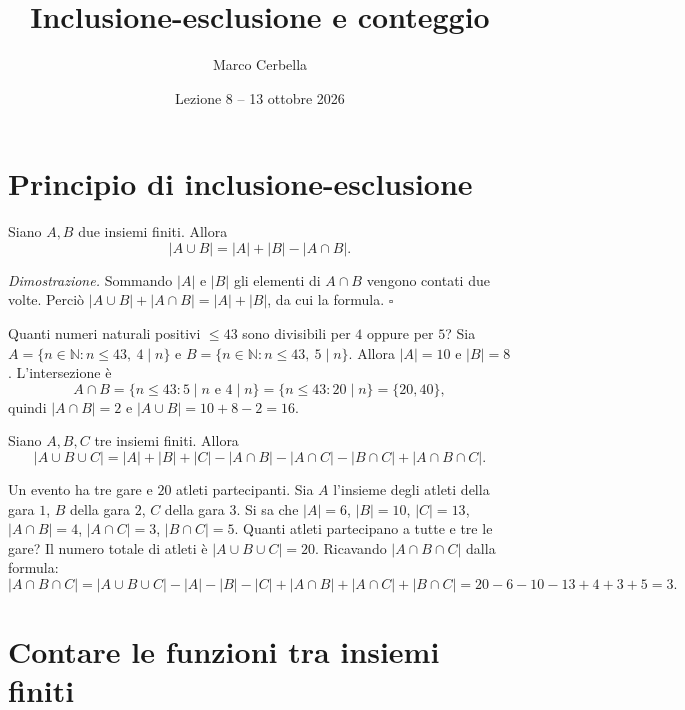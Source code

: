 \documentclass[11pt,a4paper]{article}
\title{Inclusione-esclusione e conteggio}
\author{Marco Cerbella}
\date{Lezione 8 -- 13 ottobre 2026}
\begin{document}
\maketitle

\section{Principio di inclusione-esclusione}

\begin{proposizione}
Siano $A, B$ due insiemi finiti. Allora
\[
|A \cup B| = |A| + |B| - |A \cap B|.
\]
\end{proposizione}

\emph{Dimostrazione.} Sommando $|A|$ e $|B|$ gli elementi di $A \cap B$ vengono contati due volte. Perciò $|A \cup B| + |A \cap B| = |A| + |B|$, da cui la formula. \hfill $\square$

\begin{esempio}
Quanti numeri naturali positivi $\le 43$ sono divisibili per $4$ oppure per $5$?
Sia $A = \{n \in \mathbb{N} : n \le 43,\ 4 \mid n\}$ e $B = \{n \in \mathbb{N} : n \le 43,\ 5 \mid n\}$. Allora $|A| = 10$ e $|B| = 8$. L'intersezione è
\[
A \cap B = \{n \le 43 : 5 \mid n \text{ e } 4 \mid n\} = \{n \le 43 : 20 \mid n\} = \{20, 40\},
\]
quindi $|A \cap B| = 2$ e $|A \cup B| = 10 + 8 - 2 = 16$.
\end{esempio}

\begin{proposizione}
Siano $A, B, C$ tre insiemi finiti. Allora
\[
|A \cup B \cup C| = |A| + |B| + |C| - |A \cap B| - |A \cap C| - |B \cap C| + |A \cap B \cap C|.
\]
\end{proposizione}

\begin{esempio}
Un evento ha tre gare e $20$ atleti partecipanti. Sia $A$ l'insieme degli atleti della gara $1$, $B$ della gara $2$, $C$ della gara $3$. Si sa che $|A| = 6$, $|B| = 10$, $|C| = 13$, $|A \cap B| = 4$, $|A \cap C| = 3$, $|B \cap C| = 5$. Quanti atleti partecipano a tutte e tre le gare?
Il numero totale di atleti è $|A \cup B \cup C| = 20$. Ricavando $|A \cap B \cap C|$ dalla formula:
\[
|A \cap B \cap C| = |A \cup B \cup C| - |A| - |B| - |C| + |A \cap B| + |A \cap C| + |B \cap C| = 20 - 6 - 10 - 13 + 4 + 3 + 5 = 3.
\]
\end{esempio}

\section{Contare le funzioni tra insiemi finiti}
\end{document}
